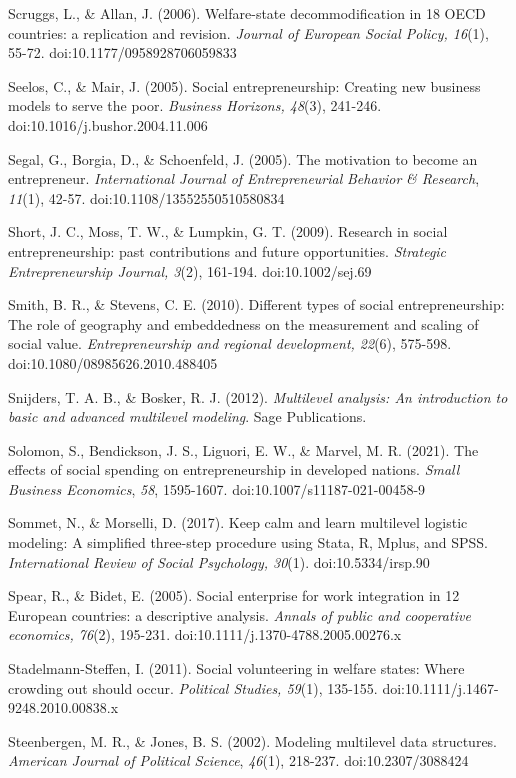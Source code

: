 \documentclass{article}
\begin{document}
Scruggs, L., \& Allan, J. (2006). Welfare-state decommodification in 18 OECD countries: a replication and revision. \emph{Journal of European Social Policy, 16}(1), 55-72. doi:10.1177/0958928706059833

Seelos, C., \& Mair, J. (2005). Social entrepreneurship: Creating new business models to serve the poor. \emph{Business Horizons, 48}(3), 241-246. doi:10.1016/j.bushor.2004.11.006

Segal, G., Borgia, D., \& Schoenfeld, J. (2005). The motivation to become an entrepreneur. \emph{International Journal of Entrepreneurial }\emph{Behavior}\emph{ \& Research}, \emph{11}(1), 42-57. doi:10.1108/13552550510580834

Short, J. C., Moss, T. W., \& Lumpkin, G. T. (2009). Research in social entrepreneurship: past contributions and future opportunities. \emph{Strategic Entrepreneurship Journal, 3}(2), 161-194. doi:10.1002/sej.69

Smith, B. R., \& Stevens, C. E. (2010). Different types of social entrepreneurship: The role of geography and embeddedness on the measurement and scaling of social value. \emph{Entrepreneurship and regional development, 22}(6), 575-598. doi:10.1080/08985626.2010.488405

Snijders, T. A. B., \& Bosker, R. J. (2012). \emph{Multilevel analysis: An introduction to basic and advanced multilevel }\emph{modeling}. Sage Publications.

Solomon, S., Bendickson, J. S., Liguori, E. W., \& Marvel, M. R. (2021). The effects of social spending on entrepreneurship in developed nations. \emph{Small Business Economics}, \emph{58}, 1595-1607. doi:10.1007/s11187-021-00458-9

Sommet, N., \& Morselli, D. (2017). Keep calm and learn multilevel logistic modeling: A simplified three-step procedure using Stata, R, Mplus, and SPSS. \emph{International Review of Social Psychology, 30}(1). doi:10.5334/irsp.90

Spear, R., \& Bidet, E. (2005). Social enterprise for work integration in 12 European countries: a descriptive analysis. \emph{Annals of public and cooperative economics, 76}(2), 195-231. doi:10.1111/j.1370-4788.2005.00276.x

Stadelmann-Steffen, I. (2011). Social volunteering in welfare states: Where crowding out should occur. \emph{Political Studies, 59}(1), 135-155. doi:10.1111/j.1467-9248.2010.00838.x

Steenbergen, M. R., \& Jones, B. S. (2002). Modeling multilevel data structures. \emph{American Journal of Political Science}, \emph{46}(1), 218-237. doi:10.2307/3088424 
\end{document}
